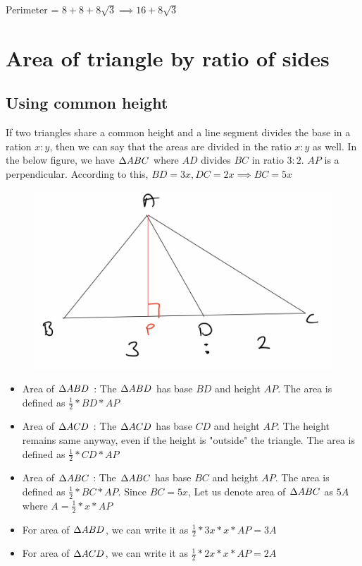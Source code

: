 Perimeter = $8 + 8 + 8\sqrt{3} \implies 16 + 8\sqrt{3}$

\newpage










\section{Area of triangle by ratio of sides}

\subsection{Using common height}

If two triangles share a common height and a line segment divides the base in a ration $x:y$, then we can say that the areas are divided in the ratio $x:y$ as well. In the below figure, we have $\Delta {ABC}$ where $AD$ divides $BC$ in ratio $3:2$. $AP$ is a perpendicular. According to this, $BD = 3x, DC = 2x \implies BC = 5x$

\begin{figure}[h!]
    \centering
    \includegraphics[width=0.4\linewidth]{Quant//Geometry//Images//Triangles/triangles_11_common_height_area.png}
\end{figure}

\begin{itemize}
    \item Area of $\Delta {ABD}$ : The $\Delta {ABD}$ has base $BD$ and height $AP$. The area is defined as $\frac{1}{2} * BD * AP$
    \item Area of $\Delta {ACD}$ : The $\Delta {ACD}$ has base $CD$ and height $AP$. The height remains same anyway, even if the height is "outside" the triangle. The area is defined as $\frac{1}{2} * CD * AP$
    \item Area of $\Delta {ABC}$ : The $\Delta {ABC}$ has base $BC$ and height $AP$. The area is defined as $\frac{1}{2} * BC * AP$. Since $BC = 5x$, Let us denote area of $\Delta {ABC}$ as $5A$ where $A = \frac{1}{2} * x * AP$
    \item For area of $\Delta {ABD}$, we can write it as $\frac{1}{2} * 3x * x * AP = 3A$
    \item For area of $\Delta {ACD}$, we can write it as $\frac{1}{2} * 2x * x * AP = 2A$
\end{itemize}

